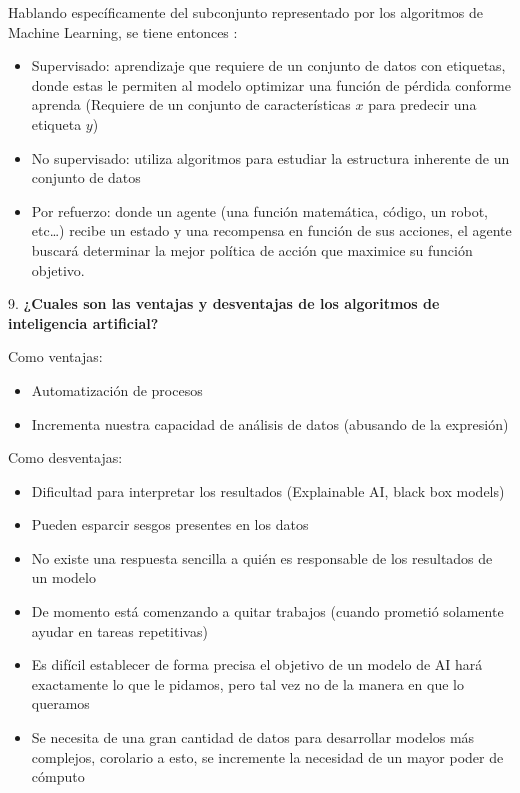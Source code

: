 \documentclass{article}
\begin{document}
        Hablando específicamente del subconjunto representado por los algoritmos de Machine Learning, se tiene entonces \cite{delua-2021}:
        \begin{itemize}
            \item Supervisado: aprendizaje que requiere de un conjunto de datos con etiquetas, donde estas le permiten al modelo optimizar una función de pérdida conforme aprenda (Requiere de un conjunto de características $x$ para predecir una etiqueta $y$)
            \item No supervisado: utiliza algoritmos para estudiar la estructura inherente de un conjunto de datos
            \item Por refuerzo: donde un agente (una función matemática, código, un robot, etc\dots) recibe un estado y una recompensa en función de sus acciones, el agente buscará determinar la mejor política de acción que maximice su función objetivo. \cite{ladosz2022exploration}
        \end{itemize}


    9. \textbf{¿Cuales son las ventajas y desventajas de los algoritmos de inteligencia artificial?}

        Como ventajas:
        \begin{itemize}
            \item Automatización de procesos
            \item Incrementa nuestra capacidad de análisis de datos (abusando de la expresión)
        \end{itemize}

        Como desventajas:
        \begin{itemize}
            \item Dificultad para interpretar los resultados (Explainable AI, black box models)
            \item Pueden esparcir sesgos presentes en los datos
            \item No existe una respuesta sencilla a quién es responsable de los resultados de un modelo
            \item De momento está comenzando a quitar trabajos (cuando prometió solamente ayudar en tareas repetitivas)
            \item Es difícil establecer de forma precisa el objetivo de un modelo de AI hará exactamente lo que le pidamos, pero tal vez no de la manera en que lo queramos
            \item Se necesita de una gran cantidad de datos para desarrollar modelos más complejos, corolario a esto, se incremente la necesidad de un mayor poder de cómputo
        \end{itemize}

    \clearpage
    
    
\end{document}
